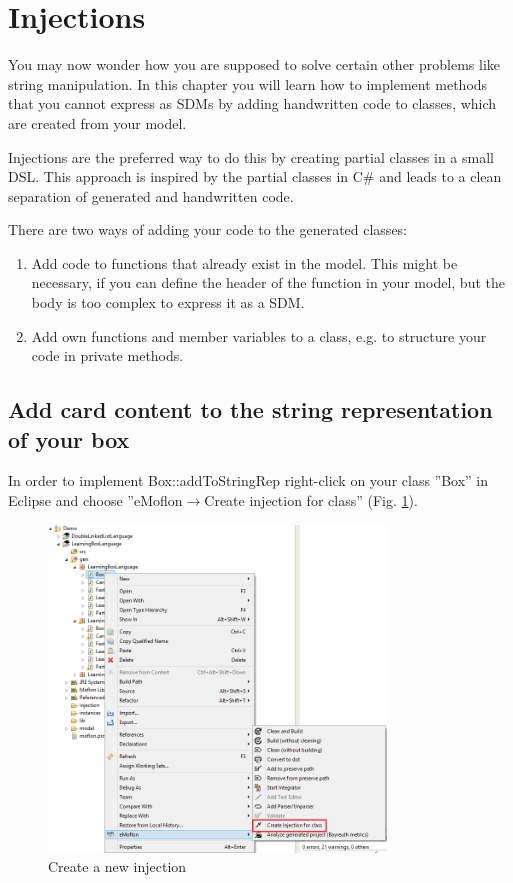 \section{Injections}
\label{sec:intro_injections}

You may now wonder how you are supposed to solve certain other problems like string manipulation. In this chapter you will learn how to implement methods that you cannot express as SDMs by adding handwritten code to classes, which are created from your model.

Injections are the preferred way to do this by creating partial classes in a small DSL. This approach is inspired by the partial classes in C\# and leads to a clean separation of generated and handwritten code.

There are two ways of adding your code to the generated classes:

\begin{enumerate}
    \item Add code to functions that already exist in the model. This might be necessary, if you can define the header of the function in your model, but the body is too complex to express it as a SDM.
    \item Add own functions and member variables to a class, e.g. to structure your code in private methods.
\end{enumerate}

\subsection{Add card content to the string representation of your box}

    In order to implement Box::addToStringRep right-click on your class ''Box'' in Eclipse and choose ''eMoflon$\rightarrow$Create injection for class'' (Fig. \ref{fig:injection_create_injection}).

    \begin{figure}[htbp]
        \centering
        \includegraphics[width=0.8\textwidth]{pics/injectionBilder/create_injection_context_menu.png}
        \caption{Create a new injection}
        \label{fig:injection_create_injection}
    \end{figure}

